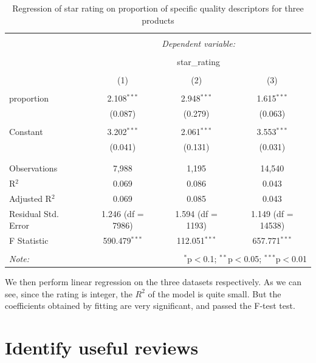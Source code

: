 \documentclass[12pt,a4paper,]{article}
\begin{document}
\begin{table}[!htbp] \centering 
  \caption{Regression of star rating on proportion of specific quality descriptors for three products} 
  \label{} 
\begin{tabular}{@{\extracolsep{5pt}}lccc} 
\\[-1.8ex]\hline 
\hline \\[-1.8ex] 
 & \multicolumn{3}{c}{\textit{Dependent variable:}} \\ 
\cline{2-4} 
\\[-1.8ex] & \multicolumn{3}{c}{star\_rating} \\ 
\\[-1.8ex] & (1) & (2) & (3)\\ 
\hline \\[-1.8ex] 
 proportion & 2.108$^{***}$ & 2.948$^{***}$ & 1.615$^{***}$ \\ 
  & (0.087) & (0.279) & (0.063) \\ 
  & & & \\ 
 Constant & 3.202$^{***}$ & 2.061$^{***}$ & 3.553$^{***}$ \\ 
  & (0.041) & (0.131) & (0.031) \\ 
  & & & \\ 
\hline \\[-1.8ex] 
Observations & 7,988 & 1,195 & 14,540 \\ 
R$^{2}$ & 0.069 & 0.086 & 0.043 \\ 
Adjusted R$^{2}$ & 0.069 & 0.085 & 0.043 \\ 
Residual Std. Error & 1.246 (df = 7986) & 1.594 (df = 1193) & 1.149 (df = 14538) \\ 
F Statistic & 590.479$^{***}$ & 112.051$^{***}$  & 657.771$^{***}$  \\ 
\hline 
\hline \\[-1.8ex] 
\textit{Note:}  & \multicolumn{3}{r}{$^{*}$p$<$0.1; $^{**}$p$<$0.05; $^{***}$p$<$0.01} \\ 
\end{tabular} 
\end{table}

We then perform linear regression on the three datasets respectively. As
we can see, since the rating is integer, the \(R^{2}\) of the model is
quite small. But the coefficients obtained by fitting are very
significant, and passed the F-test test.

\hypertarget{identify-useful-reviews}{%
\section{Identify useful reviews}\label{identify-useful-reviews}}
\end{document}
